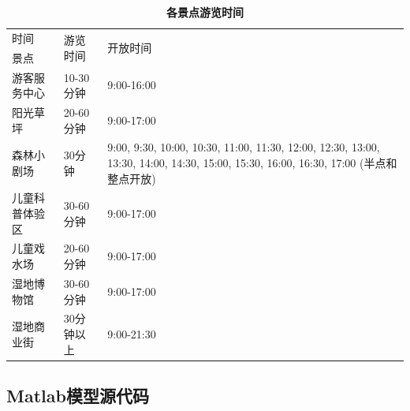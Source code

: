 \documentclass[hyperref,UTF8]{article}
\begin{document}
\begin{table}[htbp]
  \centering
  \caption{\textbf{各景点游览时间}}\label{xinxi2}%
    \begin{tabular}{|p{7.61em}|p{5.055em}|p{24.165em}|}
    \hline
                 时间 & \multirow{2}[2]{*}{游览时间} & \multirow{2}[2]{*}{开放时间} \bigstrut[t]\\
    景点    & \multicolumn{1}{r|}{} & \multicolumn{1}{r|}{} \bigstrut[b]\\
    \hline
    游客服务中心 & 10-30分钟 & 9:00-16:00 \bigstrut\\
    \hline
    阳光草坪  & 20-60分钟 & 9:00-17:00 \bigstrut\\
    \hline
    森林小剧场 & 30分钟  & 9:00, 9:30, 10:00, 10:30, 11:00, 11:30, 12:00, 12:30, 13:00, 13:30, 14:00, 14:30, 15:00, 15:30, 16:00, 16:30, 17:00 (半点和整点开放) \bigstrut\\
    \hline
    儿童科普体验区 & 30-60分钟 & 9:00-17:00 \bigstrut\\
    \hline
    儿童戏水场 & 20-60分钟 & 9:00-17:00 \bigstrut\\
    \hline
    湿地博物馆 & 30-60分钟 & 9:00-17:00 \bigstrut\\
    \hline
    湿地商业街 & 30分钟以上 & 9:00-21:30 \bigstrut\\
    \hline
    \end{tabular}%
  
\end{table}%

\subsection{Matlab模型源代码}
\end{document}
